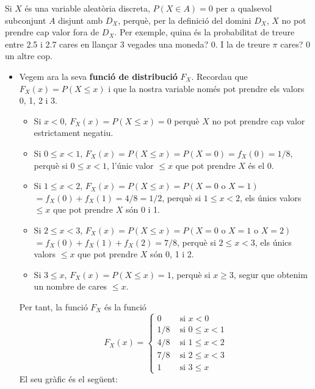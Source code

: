 \documentclass[
]{book}
\renewcommand{\leq}{\leqslant}
\renewcommand{\geq}{\geqslant}
\newenvironment{rmdblock}[1]
  {
  \begin{itemize}
  \renewcommand{\labelitemi}{
    \raisebox{-.7\height}[0pt][0pt]{
      {\setkeys{Gin}{width=3em,keepaspectratio}\texttt{[image: Bioestadística-II\_files/figure-html/\#1]}}
    }
  }
  \setlength{\fboxsep}{1em}
  \begin{kframe}
  \item
  }
  {
  \end{kframe}
  \end{itemize}
  }
\newenvironment{rmdnote}
  {\begin{rmdblock}{note}}
  {\end{rmdblock}}
\theoremstyle{definition}
\theoremstyle{definition}
\theoremstyle{definition}
\theoremstyle{remark}
\begin{document}
\begin{rmdnote}
Si \(X\) és una variable aleatòria discreta, \(P(X\in A)=0\) per a qualsevol subconjunt \(A\) disjunt amb \(D_X\), perquè, per la definició del domini \(D_X\), \(X\) no pot prendre cap valor fora de \(D_X\). Per exemple, quina és la probabilitat de treure entre 2.5 i 2.7 cares en llançar 3 vegades una moneda? 0. I la de treure \(\pi\) cares? 0 un altre cop.
\end{rmdnote}

\begin{itemize}
\item
  Vegem ara la seva \textbf{funció de distribució} \(F_X\). Recordau que \(F_X(x)=P(X\leq x)\) i que la nostra variable només pot prendre els valors 0, 1, 2 i 3.

  \begin{itemize}
  \item
    Si \(x<0\), \(F_X(x)=P(X\leq x)=0\) perquè \(X\) no pot prendre cap valor estrictament negatiu.
  \item
    Si \(0\leq x<1\), \(F_X(x)=P(X\leq x)=P(X=0)=f_X(0)=1/8\), perquè si \(0\leq x<1\), l'únic valor \(\leq x\) que pot prendre \(X\) és el 0.
  \item
    Si \(1\leq x<2\), \(F_X(x)=P(X\leq x)=P(X=0\text{ o }X=1)\) \(=f_X(0)+f_X(1)=4/8=1/2\), perquè si \(1\leq x<2\), els únics valors \(\leq x\) que pot prendre \(X\) són 0 i 1.
  \item
    Si \(2\leq x<3\), \(F_X(x)=P(X\leq x)=P(X=0\text{ o }X=1\text{ o }X=2)\) \(=f_X(0)+f_X(1)+f_X(2)=7/8\), perquè si \(2\leq x<3\), els únics valors \(\leq x\) que pot prendre \(X\) són 0, 1 i 2.
  \item
    Si \(3\leq x\), \(F_X(x)=P(X\leq x)=1\), perquè si \(x\geq 3\), segur que obtenim un nombre de cares \(\leq x\).
  \end{itemize}

  Per tant, la funció \(F_X\) és la funció
  \[
  F_X(x) =\left\{
  \begin{array}{ll}
  0 & \text{ si $x<0$}\\
  1/8 & \text{ si $0\leq x< 1$}\\ 
  4/8 & \text{ si $1\leq x< 2$}\\ 
  7/8 & \text{ si $2\leq x< 3$}\\ 
  1 & \text{ si $3\leq x$}
  \end{array}
  \right.
  \]
  El seu gràfic és el següent:
\end{itemize}
\end{document}
